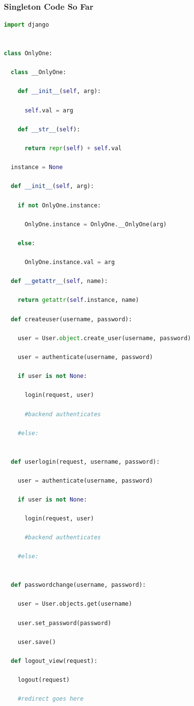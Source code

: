 \documentclass{article}
\begin{document}
\subsubsection{Singleton Code So Far}
\begin{lstlisting}[language = Python]
import django


class OnlyOne:

  class __OnlyOne:

    def __init__(self, arg):

      self.val = arg

    def __str__(self):

      return repr(self) + self.val

  instance = None

  def __init__(self, arg):

    if not OnlyOne.instance:

      OnlyOne.instance = OnlyOne.__OnlyOne(arg)

    else:

      OnlyOne.instance.val = arg

  def __getattr__(self, name):

    return getattr(self.instance, name)

  def createuser(username, password):

    user = User.object.create_user(username, password)

    user = authenticate(username, password)

    if user is not None:

      login(request, user)

      #backend authenticates

    #else:


  def userlogin(request, username, password):

    user = authenticate(username, password)

    if user is not None:

      login(request, user)

      #backend authenticates

    #else:


  def passwordchange(username, password):

    user = User.objects.get(username)

    user.set_password(password)

    user.save()

  def logout_view(request):

    logout(request)

    #redirect goes here


\end{lstlisting}
\end{document}
